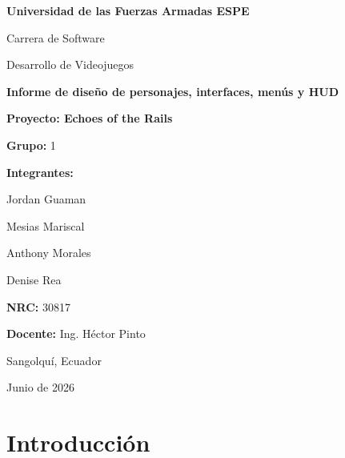 \documentclass[12pt,letterpaper]{article}
\begin{document}
\vspace*{1.65cm}
\noindent\hspace*{4.65cm}
\begin{minipage}{0.66\textwidth}
  \begin{flushleft}
    {\Large\bfseries\color{espeGreen} Universidad de las Fuerzas Armadas ESPE\par}
    \vspace{0.25cm}
    {\large Carrera de Software\par}
    \vspace{0.2cm}
    {\large Desarrollo de Videojuegos\par}
    \vspace{1.55cm}
    {\fontsize{26}{31}\selectfont\bfseries\color{ink} Informe de diseño de personajes, interfaces, menús y HUD\par}
    \vspace{0.35cm}
    {\Large\color{softGold}\bfseries Proyecto: Echoes of the Rails\par}
    \vspace{1.0cm}
    \vspace{0.55cm}

    {\bfseries Grupo:} 1\par
    \vspace{0.25cm}
    {\bfseries Integrantes:}\par
    Jordan Guaman\par
    Mesias Mariscal\par
    Anthony Morales\par
    Denise Rea\par
    \vspace{0.35cm}
    {\bfseries NRC:} 30817\par
    {\bfseries Docente:} Ing. Héctor Pinto\par
    \vspace{0.55cm}
    Sangolquí, Ecuador\par
    Junio de 2026
  \end{flushleft}
\end{minipage}
\clearpage

\tableofcontents
\newpage

\section{Introducción}
\end{document}
